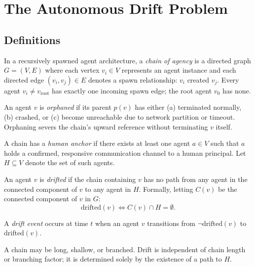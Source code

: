 \section{The Autonomous Drift Problem}

\subsection{Definitions}

In a recursively spawned agent architecture, a \emph{chain of agency} is a directed graph
$G = (V, E)$ where each vertex $v_i \in V$ represents an agent instance and each directed
edge $(v_i, v_j) \in E$ denotes a spawn relationship: $v_i$ created $v_j$.
Every agent $v_i \neq v_{\text{root}}$ has exactly one incoming spawn edge;
the root agent $v_0$ has none.

\begin{definition}
An agent $v$ is \emph{orphaned} if its parent $p(v)$ has either (a) terminated
normally, (b) crashed, or (c) become unreachable due to network partition or timeout.
Orphaning severs the chain's upward reference without terminating $v$ itself.
\end{definition}

\begin{definition}
A chain has a \emph{human anchor} if there exists at least one agent $a \in V$
such that $a$ holds a confirmed, responsive communication channel to a human
principal. Let $H \subseteq V$ denote the set of such agents.
\end{definition}

\begin{definition}
An agent $v$ is \emph{drifted} if the chain containing $v$ has no path from any
agent in the connected component of $v$ to any agent in $H$. Formally, letting
$C(v)$ be the connected component of $v$ in $G$:
\[
\text{drifted}(v) \iff C(v) \cap H = \emptyset .
\]
\end{definition}

\begin{definition}
A \emph{drift event} occurs at time $t$ when an agent $v$ transitions from
$\neg\text{drifted}(v)$ to $\text{drifted}(v)$.
\end{definition}

A chain may be long, shallow, or branched. Drift is independent of chain length
or branching factor; it is determined solely by the existence of a path to $H$.

